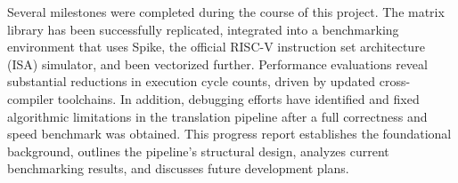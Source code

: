 Several milestones were completed during the course of this project. The matrix library has been successfully replicated, integrated into a benchmarking environment that uses Spike, the official RISC-V instruction set architecture (ISA) simulator, and been vectorized further. Performance evaluations reveal substantial reductions in execution cycle counts, driven by updated cross-compiler toolchains. In addition, debugging efforts have identified and fixed algorithmic limitations in the translation pipeline after a full correctness and speed benchmark was obtained. This progress report establishes the foundational background, outlines the pipeline's structural design, analyzes current benchmarking results, and discusses future development plans.



